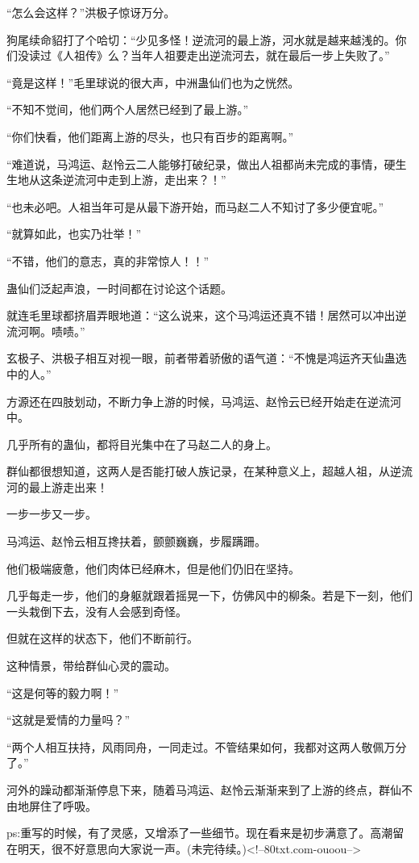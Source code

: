 \begin{this_body}
“怎么会这样？”洪极子惊讶万分。

狗尾续命貂打了个哈切：“少见多怪！逆流河的最上游，河水就是越来越浅的。你们没读过《人祖传》么？当年人祖要走出逆流河去，就在最后一步上失败了。”

“竟是这样！”毛里球说的很大声，中洲蛊仙们也为之恍然。

“不知不觉间，他们两个人居然已经到了最上游。”

“你们快看，他们距离上游的尽头，也只有百步的距离啊。”

“难道说，马鸿运、赵怜云二人能够打破纪录，做出人祖都尚未完成的事情，硬生生地从这条逆流河中走到上游，走出来？！”

“也未必吧。人祖当年可是从最下游开始，而马赵二人不知讨了多少便宜呢。”

“就算如此，也实乃壮举！”

“不错，他们的意志，真的非常惊人！！”

蛊仙们泛起声浪，一时间都在讨论这个话题。

就连毛里球都挤眉弄眼地道：“这么说来，这个马鸿运还真不错！居然可以冲出逆流河啊。啧啧。”

玄极子、洪极子相互对视一眼，前者带着骄傲的语气道：“不愧是鸿运齐天仙蛊选中的人。”

方源还在四肢划动，不断力争上游的时候，马鸿运、赵怜云已经开始走在逆流河中。

几乎所有的蛊仙，都将目光集中在了马赵二人的身上。

群仙都很想知道，这两人是否能打破人族记录，在某种意义上，超越人祖，从逆流河的最上游走出来！

一步一步又一步。

马鸿运、赵怜云相互搀扶着，颤颤巍巍，步履蹒跚。

他们极端疲惫，他们肉体已经麻木，但是他们仍旧在坚持。

几乎每走一步，他们的身躯就跟着摇晃一下，仿佛风中的柳条。若是下一刻，他们一头栽倒下去，没有人会感到奇怪。

但就在这样的状态下，他们不断前行。

这种情景，带给群仙心灵的震动。

“这是何等的毅力啊！”

“这就是爱情的力量吗？”

“两个人相互扶持，风雨同舟，一同走过。不管结果如何，我都对这两人敬佩万分了。”

河外的躁动都渐渐停息下来，随着马鸿运、赵怜云渐渐来到了上游的终点，群仙不由地屏住了呼吸。

ps:重写的时候，有了灵感，又增添了一些细节。现在看来是初步满意了。高潮留在明天，很不好意思向大家说一声。(未完待续。)<!--80txt.com-ouoou-->

\end{this_body}

